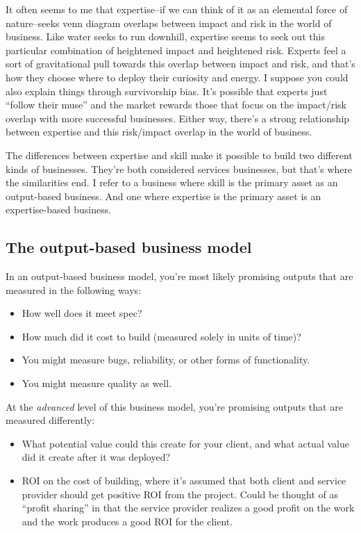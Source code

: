 It often seems to me that expertise--if we can think of it as an elemental force of nature--seeks venn diagram overlaps between impact and risk in the world of business. Like water seeks to run downhill, expertise seems to seek out this particular combination of heightened impact and heightened risk. Experts feel a sort of gravitational pull towards this overlap between impact and risk, and that's how they choose where to deploy their curiosity and energy. I suppose you could also explain things through survivorship bias. It's possible that experts just ``follow their muse'' and the market rewards those that focus on the impact/risk overlap with more successful businesses. Either way, there's a strong relationship between expertise and this risk/impact overlap in the world of business.

The differences between expertise and skill make it possible to build two different kinds of businesses. They're both considered services businesses, but that's where the similarities end. I refer to a business where skill is the primary asset as an output-based business. And one where expertise is the primary asset is an expertise-based business.

\subsection{The output-based business model}

In an output-based business model, you're most likely promising outputs that are measured in the following ways:

\begin{itemize}
\item How well does it meet spec?
\item How much did it cost to build (measured solely in units of time)?
\item You might measure bugs, reliability, or other forms of functionality.
\item You might measure quality as well.
\end{itemize}

At the \emph{advanced} level of this business model, you're promising outputs that are measured differently:

\begin{itemize}
\item What potential value could this create for your client, and what actual value did it create after it was deployed?
\item ROI on the cost of building, where it's assumed that both client and service provider should get positive ROI from the project. Could be thought of as ``profit sharing'' in that the service provider realizes a good profit on the work and the work produces a good ROI for the client.
\end{itemize}


